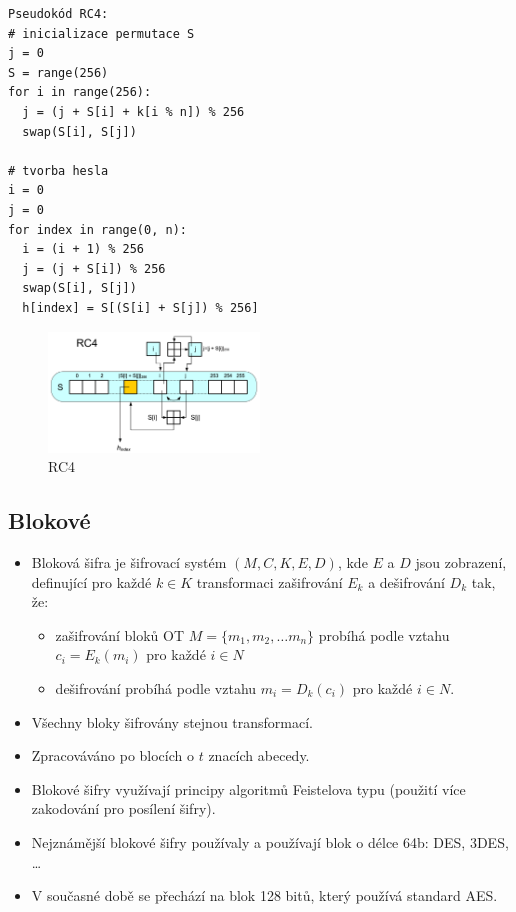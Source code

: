 \documentclass{szzclass}
\begin{document}
\begin{verbatim}
Pseudokód RC4:
# inicializace permutace S
j = 0
S = range(256)
for i in range(256):
  j = (j + S[i] + k[i % n]) % 256
  swap(S[i], S[j])

# tvorba hesla
i = 0
j = 0
for index in range(0, n):
  i = (i + 1) % 256
  j = (j + S[i]) % 256
  swap(S[i], S[j])
  h[index] = S[(S[i] + S[j]) % 256]
\end{verbatim}


\begin{figure}[!ht]
  \centering
  \includegraphics[width=0.5\textwidth]{topics/bi-spol-07/images/rc4}
  \caption{RC4}
\end{figure}

\subsection{Blokové}
\begin{itemize}
\item Bloková šifra je šifrovací systém $(M,C,K,E,D)$, kde $E$ a $D$ jsou zobrazení, definující pro každé $k\in K$ transformaci zašifrování $E_k$ a dešifrování $D_k$ tak, že:
\begin{itemize}
\item zašifrování bloků OT $M=\{m_1,m_2,\dots m_n\}$ probíhá podle vztahu $c_i=E_k(m_i)$ pro každé $i\in N$
\item dešifrování probíhá podle vztahu $m_i = D_k (c_i)$ pro každé $i\in N$.
\end{itemize}
\item Všechny bloky šifrovány stejnou transformací.
\item Zpracováváno po blocích o $t$ znacích abecedy.
\item Blokové šifry využívají principy algoritmů Feistelova typu (použití více zakodování pro posílení šifry).
\item Nejznámější blokové šifry používaly a používají blok o délce 64b: DES, 3DES, \dots
\item V současné době se přechází na blok 128 bitů, který používá standard AES.
\end{itemize}
\end{document}
